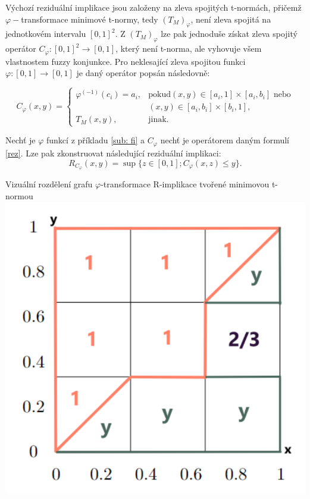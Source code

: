 {\color{red}Výchozí reziduální implikace jsou založeny na zleva spojitých t-normách, přičemž $\varphi-$transformace minimové t-normy, tedy $(T_M)_\varphi$, není zleva spojitá na jednotkovém intervalu $[0,1]^2$. Z $(T_M)_\varphi$ lze pak jednoduše získat zleva spojitý operátor $C_\varphi:[0,1]^2 \to [0,1]$, který není t-norma, ale vyhovuje všem vlastnostem fuzzy konjunkce. Pro neklesající zleva spojitou funkci $\varphi: [0,1] \to [0,1]$ je daný operátor popsán následovně:}

\begin{equation} \label{rez}
    C_{\varphi}(x,y) = \begin{cases} \varphi^{(-1)}(c_i)=a_i, &\mbox {pokud
$(x,y)\in [a_i,1]\times[a_i,b_i]$ nebo}
\\ & (x,y)\in [a_i,b_i]\times[b_i,1],
\\ T_M(x,y), &\mbox {jinak.}
\end{cases} 
\end{equation} 

\begin{example}
Nech\v t je $\varphi$ funkcí z příkladu \ref{sub: fi} a $C_\varphi$ nech\v t je operátorem daným formulí \ref{rez}. Lze pak zkonstruovat následující reziduální implikaci: $$R_{C_\varphi}(x,y)=\sup\{z \in [0,1]; C_\varphi(x,z) \leq y\}.$$
    
    \begin{graph} Vizu\' aln\' i rozd\v elen\'i grafu $\varphi$-transformace R-implikace tvořené minimovou t-normou\\
        \centering
        \includegraphics[scale=0.8]{template-fig/RPhi-impl.pdf}
    \end{graph}
\end{example}

